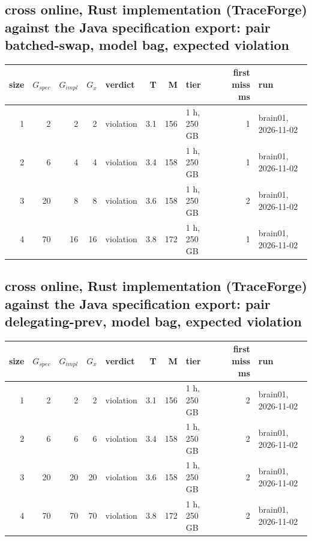 \documentclass[10pt]{article}
\begin{document}
\subsection*{cross online, Rust implementation (TraceForge) against the Java specification export: pair \textsf{batched-swap}, model bag, expected violation}
\begin{longtable}{@{}rrrrlrrlrl@{}}
\toprule
size & $G_{\mathit{spec}}$ & $G_{\mathit{impl}}$ & $G_x$ & verdict & T & M & tier & first miss ms & run \\
\midrule
\endhead
\color{red} 1 & 2 & 2 & 2 & violation & 3.1 & 156 & 1 h, 250 GB & 1 & brain01, 2026-11-02 \\
\color{red} 2 & 6 & 4 & 4 & violation & 3.4 & 158 & 1 h, 250 GB & 1 & brain01, 2026-11-02 \\
\color{red} 3 & 20 & 8 & 8 & violation & 3.6 & 158 & 1 h, 250 GB & 2 & brain01, 2026-11-02 \\
\color{red} 4 & 70 & 16 & 16 & violation & 3.8 & 172 & 1 h, 250 GB & 1 & brain01, 2026-11-02 \\
\bottomrule
\end{longtable}
\subsection*{cross online, Rust implementation (TraceForge) against the Java specification export: pair \textsf{delegating-prev}, model bag, expected violation}
\begin{longtable}{@{}rrrrlrrlrl@{}}
\toprule
size & $G_{\mathit{spec}}$ & $G_{\mathit{impl}}$ & $G_x$ & verdict & T & M & tier & first miss ms & run \\
\midrule
\endhead
\color{red} 1 & 2 & 2 & 2 & violation & 3.1 & 156 & 1 h, 250 GB & 2 & brain01, 2026-11-02 \\
\color{red} 2 & 6 & 6 & 6 & violation & 3.4 & 158 & 1 h, 250 GB & 2 & brain01, 2026-11-02 \\
\color{red} 3 & 20 & 20 & 20 & violation & 3.6 & 158 & 1 h, 250 GB & 2 & brain01, 2026-11-02 \\
\color{red} 4 & 70 & 70 & 70 & violation & 3.8 & 172 & 1 h, 250 GB & 2 & brain01, 2026-11-02 \\
\bottomrule
\end{longtable}
\end{document}
